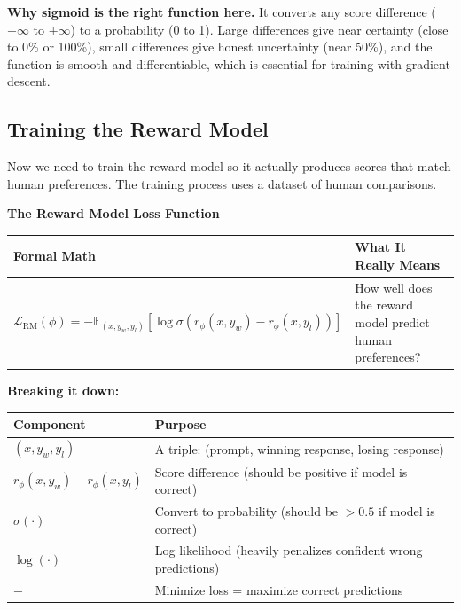 \begin{chapterenv}
\begin{infobox}
\textbf{Why sigmoid is the right function here.} It converts any score difference ($-\infty$ to $+\infty$) to a probability (0 to 1). Large differences give near certainty (close to 0\% or 100\%), small differences give honest uncertainty (near 50\%), and the function is smooth and differentiable, which is essential for training with gradient descent.
\end{infobox}

\subsection{Training the Reward Model}

Now we need to train the reward model so it actually produces scores that match human preferences. The training process uses a dataset of human comparisons.

\begin{infobox}
\textbf{The Reward Model Loss Function}

\begin{center}
\begin{tabular}{p{}p{}}
\toprule
\textbf{Formal Math} & \textbf{What It Really Means} \\
\midrule
$\mathcal{L}_{\text{RM}}(\phi) = -\mathbb{E}_{(x,y_w,y_l)}\!\left[\log \sigma(r_\phi(x,y_w) - r_\phi(x,y_l))\right]$ & How well does the reward model predict human preferences? \\
\bottomrule
\end{tabular}
\end{center}

\textbf{Breaking it down:}

\begin{center}
\begin{tabular}{p{}p{}}
\toprule
\textbf{Component} & \textbf{Purpose} \\
\midrule
$(x, y_w, y_l)$ & A triple: (prompt, winning response, losing response) \\
$r_\phi(x, y_w) - r_\phi(x, y_l)$ & Score difference (should be positive if model is correct) \\
$\sigma(\cdot)$ & Convert to probability (should be $> 0.5$ if model is correct) \\
$\log(\cdot)$ & Log likelihood (heavily penalizes confident wrong predictions) \\
$-$ & Minimize loss = maximize correct predictions \\
\bottomrule
\end{tabular}
\end{center}


\end{infobox}
\end{chapterenv}
